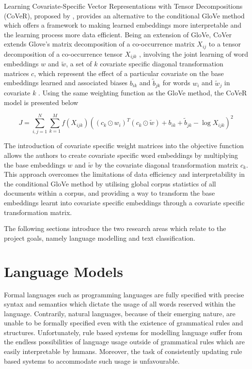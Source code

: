 \noindent
\newline
Learning Covariate-Specific Vector Representations with Tensor Decompositions (CoVeR), proposed by \cite{Tian2018}, provides an alternative to the conditional GloVe method which offers a framework to making learned embeddings more interpretable and the learning process more data efficient. Being an extension of GloVe, CoVer extends Glove's matrix decomposition of a co-occurrence matrix \(X_{ij}\) to a tensor decomposition of a co-occurrence tensor \(X_{ijk}\) , involving the joint learning of word embeddings \(w\) and \(\tilde{w}\), a set of \(k\) covariate specific diagonal transformation matrices \(c\), which represent the effect of a particular covariate on the base embeddings learned and associated biases  \(b_{ik} \) and \(\tilde{b}_{jk}\) for words \(w_{i}\) and \(\tilde{w}_{j}\) in covariate \(k\) . Using the same weighting function as the GloVe method, the CoVeR model is presented below

\begin{equation}
J = \sum_{i, j=1}^{N} \sum_{k=1}^{M} f(X_{ijk}) ((c_{k} \odot w_{i})^{T} (c_{k} \odot \tilde{w}) + b_{ik} + \tilde{b}_{jk} - \log{X_{ijk}})^{2}
\end{equation}

\noindent
\newline
The introduction of covariate specific weight matrices into the objective function allows the authors to create covariate specific word embeddings by multiplying the base embeddings \(w\) and \(\tilde{w}\) by the covariate diagonal transformation matrix \(c_{k}\). This approach overcomes the limitations of data efficiency and interpretability in the conditional GloVe method by utilising global corpus statistics of all documents within a corpus, and providing a way to transform the base embeddings learnt into covariate specific embeddings through a covariate specific transformation matrix.

\noindent
\newline
The following sections introduce the two research areas which relate to the project goals, namely language modelling and text classification.


\section{Language Models}
Formal languages such as programming languages are fully specified with precise syntax and semantics which dictate the usage of all words reserved within the language. Contrarily, natural languages, because of their emerging nature, are unable to be formally specified even with the existence of grammatical rules and structures. Unfortunately, rule based systems for modelling language suffer from the endless possibilities of language usage outside of grammatical rules which are easily interpretable by humans. Moreover, the task of consistently updating rule based systems to accommodate such usage is unfavourable.  

